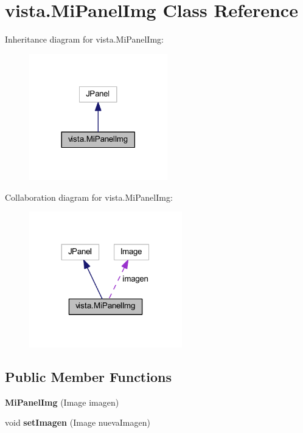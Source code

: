 \hypertarget{classvista_1_1_mi_panel_img}{}\section{vista.\+Mi\+Panel\+Img Class Reference}
\label{classvista_1_1_mi_panel_img}


Inheritance diagram for vista.\+Mi\+Panel\+Img\+:
\nopagebreak
\begin{figure}[H]
\begin{center}
\leavevmode
\includegraphics[width=170pt]{classvista_1_1_mi_panel_img__inherit__graph}
\end{center}
\end{figure}


Collaboration diagram for vista.\+Mi\+Panel\+Img\+:
\nopagebreak
\begin{figure}[H]
\begin{center}
\leavevmode
\includegraphics[width=188pt]{classvista_1_1_mi_panel_img__coll__graph}
\end{center}
\end{figure}
\subsection*{Public Member Functions}
\begin{DoxyCompactItemize}
\item 
\mbox{\label{classvista_1_1_mi_panel_img_a7350fdda1a38fd8b1a4994cfedcde13c}} 
{\bfseries Mi\+Panel\+Img} (Image imagen)
\item 
\mbox{\label{classvista_1_1_mi_panel_img_a942afea9ab9fd9a6dbde01493f0e00a1}} 
void {\bfseries set\+Imagen} (Image nueva\+Imagen)
\end{DoxyCompactItemize}
